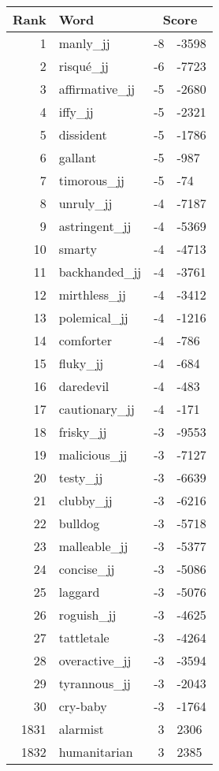\begin{longtable}[!htbp]{| rlr@{.}l |}
    \hline
    \textbf{Rank} & \textbf{Word} & \multicolumn{2}{c|}{\textbf{Score}} \\
    \hline
    \endhead
    1 & manly\_jj & -8 & -3598 \\
    2 & risqué\_jj & -6 & -7723 \\
    3 & affirmative\_jj & -5 & -2680 \\
    4 & iffy\_jj & -5 & -2321 \\
    5 & dissident & -5 & -1786 \\
    6 & gallant & -5 & -987 \\
    7 & timorous\_jj & -5 & -74 \\
    8 & unruly\_jj & -4 & -7187 \\
    9 & astringent\_jj & -4 & -5369 \\
    10 & smarty & -4 & -4713 \\
    11 & backhanded\_jj & -4 & -3761 \\
    12 & mirthless\_jj & -4 & -3412 \\
    13 & polemical\_jj & -4 & -1216 \\
    14 & comforter & -4 & -786 \\
    15 & fluky\_jj & -4 & -684 \\
    16 & daredevil & -4 & -483 \\
    17 & cautionary\_jj & -4 & -171 \\
    18 & frisky\_jj & -3 & -9553 \\
    19 & malicious\_jj & -3 & -7127 \\
    20 & testy\_jj & -3 & -6639 \\
    21 & clubby\_jj & -3 & -6216 \\
    22 & bulldog & -3 & -5718 \\
    23 & malleable\_jj & -3 & -5377 \\
    24 & concise\_jj & -3 & -5086 \\
    25 & laggard & -3 & -5076 \\
    26 & roguish\_jj & -3 & -4625 \\
    27 & tattletale & -3 & -4264 \\
    28 & overactive\_jj & -3 & -3594 \\
    29 & tyrannous\_jj & -3 & -2043 \\
    30 & cry-baby & -3 & -1764 \\
    1831 & alarmist & 3 & 2306 \\
    1832 & humanitarian & 3 & 2385 \\

\end{longtable}
